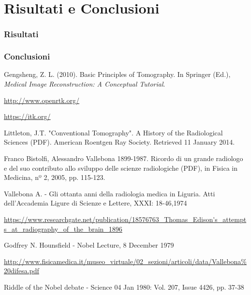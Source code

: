 \documentclass[a4paper,12pt, doubleside]{report}
\begin{document}
    \chapter{Risultati e Conclusioni}
        \subsection{Risultati}
        \subsection{Conclusioni}



\newpage
\begin{thebibliography}{1}
        Gengsheng, Z. L. (2010). Basic Principles of Tomography. In Springer (Ed.), \textit{Medical Image Reconstruction: A Conceptual Tutorial}.
        
        \url{http://www.openrtk.org/}
    
        \url{https://itk.org/}
    
        Littleton, J.T. "Conventional Tomography". A History of the Radiological Sciences (PDF). American Roentgen Ray Society. Retrieved 11 January 2014.
    
        Franco Bistolfi, Alessandro Vallebona 1899-1987. Ricordo di un grande radiologo e del suo contributo allo sviluppo delle scienze radiologiche (PDF), in Fisica in Medicina, nº 2, 2005, pp. 115-123.
        
        Vallebona A. - Gli ottanta anni della radiologia medica in Liguria. Atti dell’Accademia Ligure di Scienze e Lettere, XXXI: 18-46,1974
        
        \url{https://www.researchgate.net/publication/18576763_Thomas_Edison's_attempts_at_radiography_of_the_brain_1896}
        
        Godfrey N. Hounsfield - Nobel Lecture, 8 December 1979
        
        \url{http://www.fisicamedica.it/museo_virtuale/02_sezioni/articoli/data/Vallebona%20difesa.pdf}
        
        Riddle of the Nobel debate - Science 04 Jan 1980: Vol. 207, Issue 4426, pp. 37-38
        

\end{thebibliography}
\end{document}
